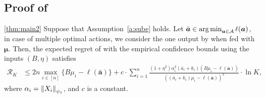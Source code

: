 \subsection{Proof of }
\label{proof:thm:main2}

\begin{restate-theorem}{\ref{thm:main2}}
	Suppose that Assumption~\ref{a:sube} holds. Let $\bar{\bm{a}} \in \operatorname*{arg\,min}_{\bm{a} \in \mathcal{A}} \ell(\bm{a})$, in case of multiple optimal actions, we consider the one output by  when fed with $\bm{\mu}$.
Then, the expected regret of  with the empirical confidence bounds using the inputs $(B, \eta)$  satisfies
\begin{align*}
	\mathcal{R}_K &\le 2n\max_{i \in [n]} \{B\mu_i -\ell(\bar{\bm{a}})\}
	 +c \cdot\sum_{i=1}^{n} \frac{(1+\eta^2) \alpha_i^2(\bar{a}_i+k_i)(B \mu_i - \ell(\bar{\bm{a}})) }{\left((\bar{a}_i+k_i)\mu_i - \ell(\bar{\bm{a}})\right)^2}\cdot \ln K,
\end{align*}
where $\alpha_i =  \left\| X_i \right\|_{\psi_1}$, and $c$ is a constant.
\end{restate-theorem}
%
